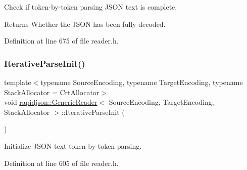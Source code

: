 Check if token-\/by-\/token parsing J\+S\+ON text is complete. 

\begin{DoxyReturn}{Returns}
Whether the J\+S\+ON has been fully decoded. 
\end{DoxyReturn}


Definition at line 675 of file reader.\+h.


\begin{DoxyCode}{0}

\end{DoxyCode}
\mbox{\label{classrapidjson_1_1_generic_reader_a90403a2c55dadf82fd2bb9d4c66b3280}} 
\subsubsection{\texorpdfstring{IterativeParseInit()}{IterativeParseInit()}}
{\footnotesize\ttfamily template$<$typename Source\+Encoding, typename Target\+Encoding, typename Stack\+Allocator = Crt\+Allocator$>$ \\
void \mbox{\hyperlink{classrapidjson_1_1_generic_reader}{rapidjson\+::\+Generic\+Reader}}$<$ Source\+Encoding, Target\+Encoding, Stack\+Allocator $>$\+::Iterative\+Parse\+Init (\begin{DoxyParamCaption}{ }\end{DoxyParamCaption})}



Initialize J\+S\+ON text token-\/by-\/token parsing. 



Definition at line 605 of file reader.\+h.


